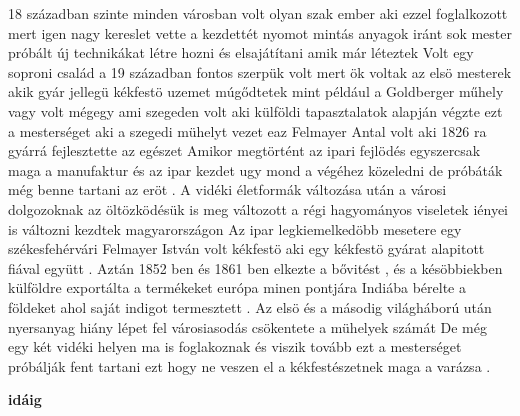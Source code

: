 \documentclass[fontsize=12pt, appendixprefix=true]{scrreprt}
\begin{document}
18 században szinte minden városban volt olyan szak ember aki ezzel foglalkozott mert igen nagy kereslet vette a kezdettét nyomot mintás anyagok iránt sok mester próbált új technikákat létre hozni és elsajátítani amik már léteztek 
Volt egy soproni család a 19 században  fontos szerpük volt mert ök voltak az elsö mesterek akik gyár jellegü kékfestö uzemet múgődtetek mint például a Goldberger műhely vagy volt mégegy ami szegeden volt  aki külföldi tapasztalatok alapján végzte ezt a mesterséget  aki a szegedi mühelyt vezet eaz Felmayer Antal volt aki 1826 ra gyárrá fejlesztette az egészet 
Amikor megtörtént az ipari fejlödés egyszercsak maga a manufaktur és az ipar kezdet ugy mond a végéhez közeledni de próbáták még benne tartani az eröt .
A vidéki életformák változása után a városi dolgozoknak az öltözködésük is meg változott a régi hagyományos viseletek iényei is változni kezdtek magyarországon 
Az ipar legkiemelkedöbb mesetere egy székesfehérvári Felmayer István volt  kékfestö  aki egy kékfestö gyárat alapitott fiával együtt .
Aztán 1852 ben és 1861 ben  elkezte a bővitést , és a késöbbiekben külföldre exportálta a termékeket európa minen pontjára Indiába bérelte a földeket ahol saját indigot termesztett .
Az elsö és a másodig világháború után nyersanyag hiány lépet fel városiasodás csökentete a mühelyek számát 
De még egy két vidéki helyen ma is foglakoznak és viszik tovább ezt a mesterséget próbálják fent tartani ezt hogy ne veszen el a kékfestészetnek maga a varázsa .

\textbf{idáig}
\end{document}
